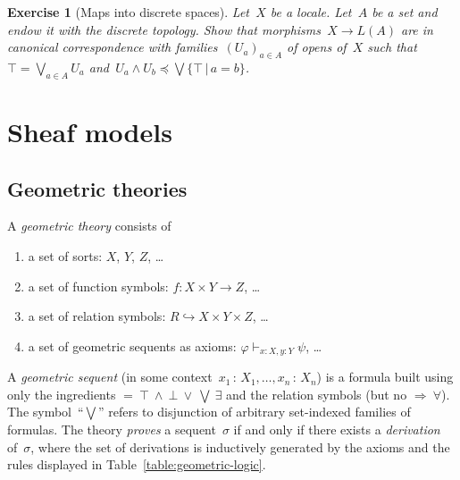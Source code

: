 \documentclass{ws-rv9x6}
\newtheorem{ex}{Exercise}
\newenvironment{exercise}[1]{
  \begin{ex}[#1]
}{\end{ex}}
\renewcommand{\_}{\mathpunct{.}}
\newcommand{\?}{\,{:}\,}
\begin{document}
\begin{exercise}{Maps into discrete spaces}%
Let~$X$ be a locale. Let~$A$ be a set and endow it with the discrete topology. Show
that morphisms~$X \to L(A)$ are in canonical correspondence with
families~$(U_a)_{a \in A}$ of opens of~$X$ such that~$\top = \bigvee_{a \in A}
U_a$ and~$U_a \wedge U_b \preceq \bigvee\{ \top \,|\, a = b \}$.
\end{exercise}


\section{Sheaf models}

\subsection{Geometric theories}

\begin{definition}A \emph{geometric theory} consists of
\begin{enumerate}
  \item a set of sorts: $X$, $Y$, $Z$, \ldots
  \item a set of function symbols: $f : X \times Y \to Z$, \ldots
  \item a set of relation symbols: $R \hookrightarrow X \times Y \times Z$, \ldots
  \item a set of geometric sequents as axioms: $\varphi \vdash_{x:X, y:Y} \psi$, \ldots
\end{enumerate}
A \emph{geometric sequent} (in some context~$x_1\?X_1,\ldots,x_n\?X_n$) is a
formula built using only the ingredients ${=}\ {\top}\ {\wedge}\ {\bot}\
{\vee}\ {\bigvee}\ {\exists}$ and the relation symbols (but no ${\Rightarrow}\
{\forall}$). The symbol~``$\bigvee$'' refers to disjunction of arbitrary
set-indexed families of formulas. The theory \emph{proves} a sequent~$\sigma$ if and
only if there exists a \emph{derivation} of~$\sigma$, where the set of
derivations is inductively generated by the axioms and the rules displayed in
Table~\ref{table:geometric-logic}.
\end{definition}
\end{document}
